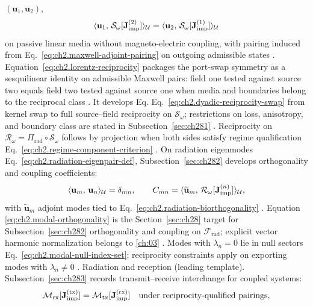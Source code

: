 \((\mathbf{u}_1,\mathbf{u}_2)\),
\begin{equation}
\label{eq:ch2.lorentz-reciprocity}
\langle \mathbf{u}_1,\,\mathcal{S}_\omega[\mathbf{J}_{\mathrm{imp}}^{(2)}]\rangle_{\mathcal{U}}
=
\langle \mathbf{u}_2,\,\mathcal{S}_\omega[\mathbf{J}_{\mathrm{imp}}^{(1)}]\rangle_{\mathcal{U}}
\end{equation}
on passive linear media without magneto-electric coupling, with pairing induced from
Eq.~\eqref{eq:ch2.maxwell-adjoint-pairing} on outgoing admissible states
\cite{stratton1941}. Equation~\eqref{eq:ch2.lorentz-reciprocity}
packages the port-swap symmetry as a sesquilinear identity on admissible Maxwell pairs: field
one tested against source two equals field two tested against source one when media and
boundaries belong to the reciprocal class \cite{stratton1941}. It develops Eq.
Eq.~\eqref{eq:ch2.dyadic-reciprocity-swap} from kernel swap to full source--field reciprocity
on \(\mathcal{S}_\omega\); restrictions on loss, anisotropy, and boundary class are stated in
Subsection~\ref{sec:ch281} \cite{stratton1941}. Reciprocity on
\(\mathcal{R}_\omega=\Pi_{\mathrm{rad}}\circ\mathcal{S}_\omega\) follows by projection when
both sides satisfy regime qualification Eq.~\eqref{eq:ch2.regime-component-criterion}
\cite{harrington2001}.
On radiation eigenmodes Eq.~\eqref{eq:ch2.radiation-eigenpair-def}, Subsection~\ref{sec:ch282}
develops orthogonality and coupling coefficients:
\begin{equation}
\label{eq:ch2.modal-orthogonality}
\langle \mathbf{u}_m,\,\mathbf{u}_n\rangle_{\mathcal{U}}
=
\delta_{mn},
\qquad
C_{mn}
=
\langle \widetilde{\mathbf{u}}_m,\,\mathcal{R}_\omega[\mathbf{J}_{\mathrm{imp}}^{(n)}]\rangle_{\mathcal{U}},
\end{equation}
with \(\widetilde{\mathbf{u}}_m\) adjoint modes tied to
Eq.~\eqref{eq:ch2.radiation-biorthogonality} \cite{stratton1941}. Equation
\eqref{eq:ch2.modal-orthogonality} is the Section~\ref{sec:ch28} target for
Subsection~\ref{sec:ch282} orthogonality and coupling on \(\mathcal{F}_{\mathrm{rad}}\);
explicit vector harmonic normalization belongs to \ref{ch:03}
\cite{stratton1941}. Modes with \(\lambda_n=0\) lie in null sectors
Eq.~\eqref{eq:ch2.modal-null-index-set}; reciprocity constraints apply on exporting modes
with \(\lambda_n\neq 0\) \cite{harrington2001}.
Radiation and reception (leading template). Subsection~\ref{sec:ch283} records transmit--receive interchange for coupled systems:
\begin{equation}
\label{eq:ch2.transmit-receive-swap}
\mathcal{M}_{\mathrm{rx}}[\mathbf{J}_{\mathrm{imp}}^{\mathrm{(tx)}}]
=
\mathcal{M}_{\mathrm{tx}}[\mathbf{J}_{\mathrm{imp}}^{\mathrm{(rx)}}]
\quad\text{under reciprocity-qualified pairings},
\end{equation}
